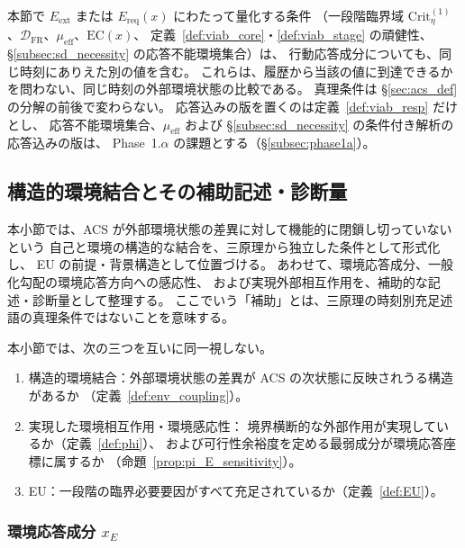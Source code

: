 \begin{remark}[同じ時刻にありえた外部環境状態にわたる量化]
\label{rem:same_time_alternatives}
本節で $E_{\mathrm{ext}}$ または $E_{\mathrm{req}}(x)$ にわたって量化する条件
（一段階臨界域 $\mathrm{Crit}^{(1)}_\eta$、$\mathcal D_{\mathrm{FR}}$、$\mu_{\mathrm{eff}}$、$\mathrm{EC}(x)$、
定義~\ref{def:viab_core}・\ref{def:viab_stage} の頑健性、
\S\ref{subsec:sd_necessity} の応答不能環境集合）は、
行動応答成分についても、同じ時刻にありえた別の値を含む。
これらは、履歴から当該の値に到達できるかを問わない、同じ時刻の外部環境状態の比較である。
真理条件は \S\ref{sec:acs_def} の分解の前後で変わらない。
応答込みの版を置くのは定義~\ref{def:viab_resp} だけとし、
応答不能環境集合、$\mu_{\mathrm{eff}}$ および \S\ref{subsec:sd_necessity} の条件付き解析の応答込みの版は、
Phase~1.$\alpha$ の課題とする（\S\ref{subsec:phase1a}）。
\end{remark}

\subsection{構造的環境結合とその補助記述・診断量}
\label{subsec:env_coupling}

本小節では、ACS が外部環境状態の差異に対して機能的に閉鎖し切っていないという
自己と環境の構造的な結合を、三原理から独立した条件として形式化し、
EU の前提・背景構造として位置づける。
あわせて、環境応答成分、一般化勾配の環境応答方向への感応性、
および実現外部相互作用を、補助的な記述・診断量として整理する。
ここでいう「補助」とは、三原理の時刻別充足述語の真理条件ではないことを意味する。

本小節では、次の三つを互いに同一視しない。
\begin{enumerate}
  \item 構造的環境結合：外部環境状態の差異が ACS の次状態に反映されうる構造があるか
  （定義~\ref{def:env_coupling}）。
  \item 実現した環境相互作用・環境感応性：
  境界横断的な外部作用が実現しているか（定義~\ref{def:phi}）、
  および可行性余裕度を定める最弱成分が環境応答座標に属するか
  （命題~\ref{prop:pi_E_sensitivity}）。
  \item EU：一段階の臨界必要要因がすべて充足されているか（定義~\ref{def:EU}）。
\end{enumerate}

\subsubsection{環境応答成分 $x_E$}

